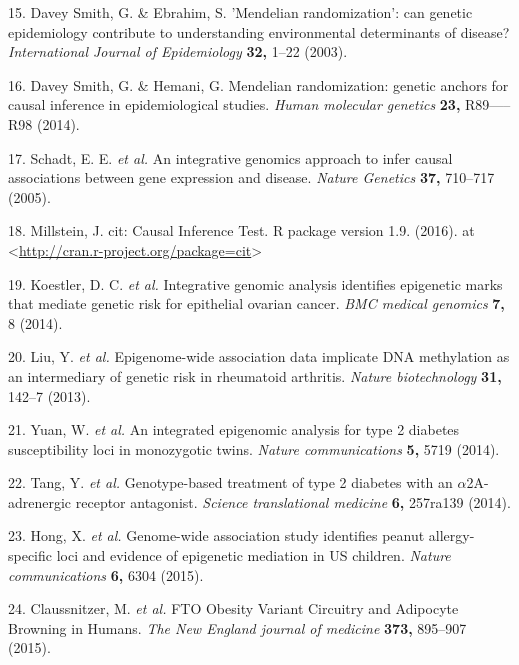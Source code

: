 \documentclass[]{article}
\begin{document}
\hypertarget{ref-DaveySmith2003}{}
15. Davey Smith, G. \& Ebrahim, S. 'Mendelian randomization': can
genetic epidemiology contribute to understanding environmental
determinants of disease? \emph{International Journal of Epidemiology}
\textbf{32,} 1--22 (2003).

\hypertarget{ref-DaveySmithHemani2014}{}
16. Davey Smith, G. \& Hemani, G. Mendelian randomization: genetic
anchors for causal inference in epidemiological studies. \emph{Human
molecular genetics} \textbf{23,} R89-----R98 (2014).

\hypertarget{ref-Schadt2005}{}
17. Schadt, E. E. \emph{et al.} An integrative genomics approach to
infer causal associations between gene expression and disease.
\emph{Nature Genetics} \textbf{37,} 710--717 (2005).

\hypertarget{ref-Millstein2016}{}
18. Millstein, J. cit: Causal Inference Test. R package version 1.9.
(2016). at
\textless{}\url{http://cran.r-project.org/package=cit}\textgreater{}

\hypertarget{ref-Koestler2014}{}
19. Koestler, D. C. \emph{et al.} Integrative genomic analysis
identifies epigenetic marks that mediate genetic risk for epithelial
ovarian cancer. \emph{BMC medical genomics} \textbf{7,} 8 (2014).

\hypertarget{ref-Liu2013}{}
20. Liu, Y. \emph{et al.} Epigenome-wide association data implicate DNA
methylation as an intermediary of genetic risk in rheumatoid arthritis.
\emph{Nature biotechnology} \textbf{31,} 142--7 (2013).

\hypertarget{ref-Yuan2014}{}
21. Yuan, W. \emph{et al.} An integrated epigenomic analysis for type 2
diabetes susceptibility loci in monozygotic twins. \emph{Nature
communications} \textbf{5,} 5719 (2014).

\hypertarget{ref-Tang2014}{}
22. Tang, Y. \emph{et al.} Genotype-based treatment of type 2 diabetes
with an \(\alpha\)2A-adrenergic receptor antagonist. \emph{Science
translational medicine} \textbf{6,} 257ra139 (2014).

\hypertarget{ref-Hong2015}{}
23. Hong, X. \emph{et al.} Genome-wide association study identifies
peanut allergy-specific loci and evidence of epigenetic mediation in US
children. \emph{Nature communications} \textbf{6,} 6304 (2015).

\hypertarget{ref-Claussnitzer2015}{}
24. Claussnitzer, M. \emph{et al.} FTO Obesity Variant Circuitry and
Adipocyte Browning in Humans. \emph{The New England journal of medicine}
\textbf{373,} 895--907 (2015).
\end{document}
